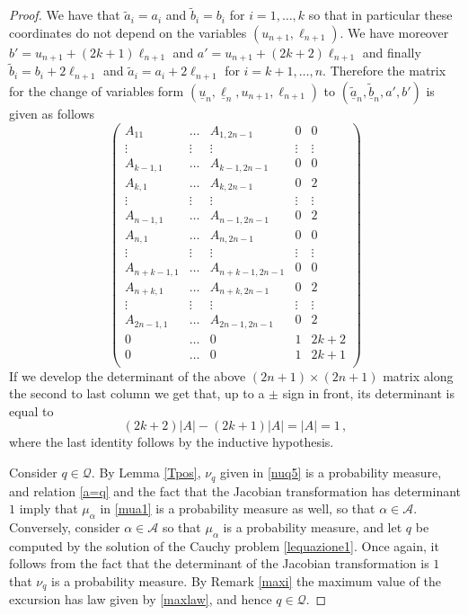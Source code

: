 \documentclass[12pt]{article}
\numberwithin{equation}{section}
\begin{document}
\begin{proof}
We have that $\tilde a_i=a_i$ and $\tilde b_i=b_i$ for $i=1,\dots , k$ so that in particular these coordinates do not depend on the variables $(u_{n+1},\ell_{n+1})$. We have moreover $b'=u_{n+1}+(2k+1)\ell_{n+1}$ and $a'=u_{n+1}+(2k+2)\ell_{n+1}$
and finally $\tilde b_i=b_i+2\ell_{n+1}$ and $\tilde a_i=a_i+2\ell_{n+1}$ for $i=k+1,\dots , n$. Therefore the matrix for the change of variables form $(\underline u_n,\underline \ell_n, u_{n+1}, \ell_{n+1})$ to $(\tilde{\underline a}_n, \tilde{\underline b}_n, a',b')$ is given as follows
\[
\left(\begin{matrix}
	A_{11}& \dots & A_{1,2n-1} & 0 & 0 \\
	\vdots & \vdots & \vdots & \vdots & \vdots \\
	A_{k-1,1} & \dots & A_{k-1,2n-1} & 0 & 0 \\
	A_{k,1} & \dots & A_{k,2n-1} & 0 & 2\\
	\vdots & \vdots & \vdots & \vdots & \vdots \\
	A_{n-1,1} & \dots & A_{n-1,2n-1} & 0 & 2 \\
	A_{n,1} & \dots & A_{n,2n-1} & 0 & 0\\
	\vdots & \vdots & \vdots & \vdots & \vdots \\
	A_{n+k-1,1} & \dots & A_{n+k-1,2n-1} & 0 & 0 \\
	A_{n+k,1} & \dots & A_{n+k, 2n-1} & 0 & 2\\
	\vdots & \vdots & \vdots & \vdots & \vdots \\
	A_{2n-1,1} & \dots & A_{2n-1,2n-1} & 0 & 2 \\
	0 & \dots & 0 & 1 & 2k+2 \\
	0 & \dots & 0 & 1 &  2k+1\\
\end{matrix}\right)
\]
If we develop the determinant of the above $(2n+1)\times (2n+1)$ matrix along the second to last column we get that, up to a $\pm$ sign in front, its determinant is equal to
\[
(2k+2)|A|-(2k+1)|A|=|A|=1\,,
\]
where the last identity follows by the inductive hypothesis.	
		
Consider $q\in \mathscr Q$. By Lemma \ref{Tpos}, $\nu_q$ given in \eqref{nuq5} is a probability measure, and relation \eqref{a=q} and the fact that the Jacobian transformation has determinant $1$ imply that $\mu_{\alpha}$ in \eqref{mua1} is a probability measure as well, so that $\alpha\in \mathcal A$. Conversely, consider $\alpha\in \mathcal A$ so that $\mu_{\alpha}$ is a probability measure, and let $q$ be computed by the solution of the Cauchy problem \eqref{lequazione1}. Once again, it follows from the fact that the determinant of the Jacobian transformation is $1$ that $\nu_q$ is a probability measure. By Remark \ref{maxi} the maximum value of the excursion has law given by \eqref{maxlaw}, and hence $q\in \mathscr Q$.
	

\end{proof}
\end{document}

